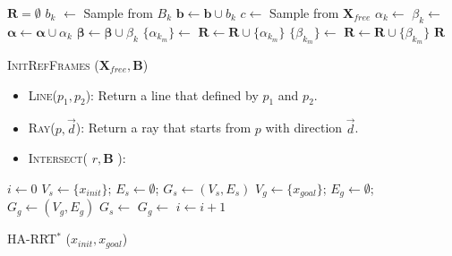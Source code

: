 \documentclass[letterpaper, 10 pt, conference]{ieeeconf}
\begin{document}
\begin{algorithm}[hbtp]
	\begin{algorithmic}[1]
		\State $ \bm{R} = \emptyset $
			\State $ b_{k} $ $ \leftarrow $ Sample from $ B_{k} $
			\State $ \bm{b} \leftarrow \bm{b} \cup b_{k} $
		\EndFor
			\State $ c \leftarrow  $ Sample from $ \bm{X}_{free} $
		\EndWhile
			\State $ \alpha_{k} \leftarrow $ 
			\State $ \beta_{k} \leftarrow $ 
			\State $ \bm{\alpha} \leftarrow \bm{\alpha} \cup \alpha_{k} $
			\State $ \bm{\beta} \leftarrow \bm{\beta} \cup \beta_{k} $			
		\EndFor
			\State $ \{ \alpha_{k_{m}} \} \leftarrow $ 
			\State $ \bm{R} \leftarrow \bm{R} \cup \{ \alpha_{k_{m}} \} $
		\EndFor
			\State $ \{ \beta_{k_{m}} \} \leftarrow $ 
			\State $ \bm{R} \leftarrow \bm{R} \cup \{ \beta_{k_{m}} \} $
		\EndFor
		\Return $ \bm{R} $
	\end{algorithmic}
	\caption{ \textsc{InitRefFrames} ($ \bm{X}_{free} , \bm{B} $) }
	\label{alg:harrt:init_ref_frames}
\end{algorithm} 

\begin{itemize}
	\item \textsc{Line}($ p_{1}, p_{2} $):
	Return a line that defined by $ p_{1} $ and $ p_{2} $.
	\item \textsc{Ray}($ p, \vec{d} $):
	Return a ray that starts from $ p $ with direction $ \vec{d}  $.
	\item \textsc{Intersect}( $ r , \bm{B} $ ):
\end{itemize}

\begin{algorithm}
	\begin{algorithmic}[1]
		\State $ i \leftarrow 0 $
		\State $ V_{s} \leftarrow \{ x_{init} \} $; $ E_{s} \leftarrow \emptyset $; $ G_{s} \leftarrow (V_{s}, E_{s}) $
		\State $ V_{g} \leftarrow \{ x_{goal} \} $; $ E_{g} \leftarrow \emptyset $; $ G_{g} \leftarrow (V_{g}, E_{g}) $
			\State $ G_{s} \leftarrow $ 
			\State $ G_{g} \leftarrow $ 
			\State $ i \leftarrow i + 1 $
		\EndWhile
		\State {}
	\end{algorithmic}
	\caption{HA-RRT$^{*}$ ($ x_{init} , x_{goal}  $) }
	\label{alg:harrt}
\end{algorithm}
\end{document}
